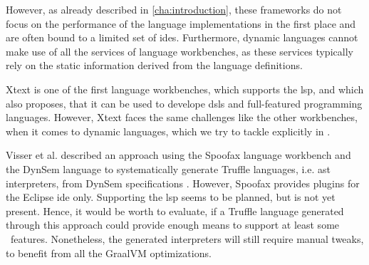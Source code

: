     However, as already described in \autoref{cha:introduction}, these frameworks do not focus on the performance of the language implementations in the first place and are often bound to a limited set of \acp{ide}. Furthermore, dynamic languages cannot make use of all the services of language workbenches, as these services typically rely on the static information derived from the language definitions.

    Xtext \cite{eysholdt2010xtext} is one of the first language workbenches, which supports the \ac{lsp}, and which also proposes, that it can be used to develope \acp{dsl} and full-featured programming languages. However, Xtext faces the same challenges like the other workbenches, when it comes to dynamic languages, which we try to tackle explicitly in \graallsp.

    Visser et al. described an approach using the Spoofax language workbench \cite{kats2010spoofax} and the DynSem language \cite{vergu_et_al:LIPIcs:2015:5208} to systematically generate Truffle languages, i.e. \ac{ast} interpreters, from DynSem specifications \cite{visser2014language}. However, Spoofax provides plugins for the Eclipse \ac{ide} only. Supporting the \ac{lsp} seems to be planned, but is not yet present. Hence, it would be worth to evaluate, if a Truffle language generated through this approach could provide enough means to support at least some \graallsp~features. Nonetheless, the generated interpreters will still require manual tweaks, to benefit from all the GraalVM optimizations.
